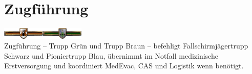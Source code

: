 \section{Zugführung}
\includegraphics[width=20mm]{./img/truppengattungen/zugfuehrung/TrBraun}\quad\includegraphics[width=20mm]{./img/truppengattungen/zugfuehrung/TrGruen}\\
Zugführung -- Trupp Grün und Trupp Braun -- befehligt Fallschirmjägertrupp Schwarz und Pioniertrupp Blau, übernimmt im Notfall medizinische Erstversorgung und koordiniert \ac{MedEvac}, \ac{CAS} und Logistik wenn benötigt. 